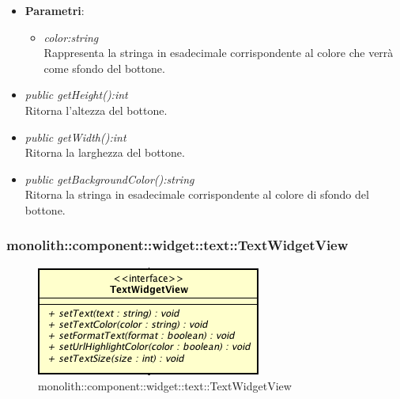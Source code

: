 \begin{itemize}
\begin{itemize}
		\item{\textbf{Parametri}: \begin{itemize}
		\item \textit{color:string}\\
		Rappresenta la stringa in esadecimale corrispondente al colore che verrà come sfondo del bottone.
		\end{itemize}}
	\item \textit{public getHeight():int}\\
	Ritorna l'altezza del bottone.
	\item \textit{public getWidth():int}\\
	Ritorna la larghezza del bottone.
	\item \textit{public getBackgroundColor():string}\\
	Ritorna la stringa in esadecimale corrispondente al colore di sfondo del bottone.
	\end{itemize}
\end{itemize}

\subsubsection{monolith::component::widget::text::TextWidgetView}

\label{monolith::component::widget::text::TextWidgetView}
\begin{figure}[ht]
	\centering
	\includegraphics[scale=0.5]{Sezioni/SottosezioniST/img/TextWidgetView.png}
	\caption{monolith::component::widget::text::TextWidgetView}
\end{figure}

